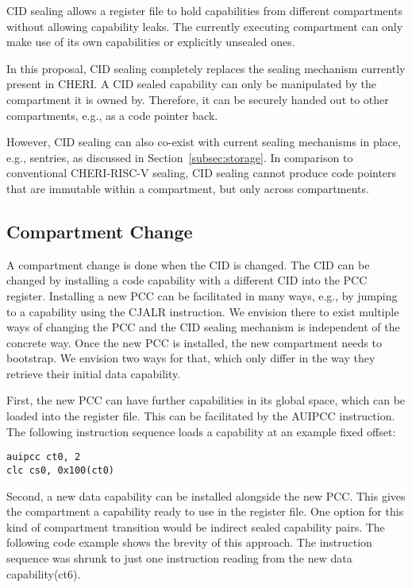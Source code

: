 CID sealing allows a register file to hold capabilities from different compartments without allowing capability leaks.
The currently executing compartment can only make use of its own capabilities or explicitly unsealed ones.

In this proposal, CID sealing completely replaces the sealing mechanism currently present in CHERI.
A CID sealed capability can only be manipulated by the compartment it is owned by.
Therefore, it can be securely handed out to other compartments, e.g., as a code pointer back.

However, CID sealing can also co-exist with current sealing mechanisms in place, e.g., sentries, as discussed in Section~\ref{subsec:storage}.
In comparison to conventional CHERI-RISC-V sealing, CID sealing cannot produce code pointers that are immutable within a compartment, but only across compartments.

\subsection{Compartment Change}
\label{subsec:comp_change}

A compartment change is done when the CID is changed.
The CID can be changed by installing a code capability with a different CID into the PCC register.
Installing a new PCC can be facilitated in many ways, e.g., by jumping to a capability using the CJALR instruction.
We envision there to exist multiple ways of changing the PCC and the CID sealing mechanism is independent of the concrete way.
Once the new PCC is installed, the new compartment needs to bootstrap.
We envision two ways for that, which only differ in the way they retrieve their initial data capability.

First, the new PCC can have further capabilities in its global space, which can be loaded into the register file.
This can be facilitated by the AUIPCC instruction.
The following instruction sequence loads a capability at an example fixed offset:

\texttt{auipcc ct0, 2}\\
\texttt{clc cs0, 0x100(ct0)}

Second, a new data capability can be installed alongside the new PCC.
This gives the compartment a capability ready to use in the register file.
One option for this kind of compartment transition would be indirect sealed capability pairs.
The following code example shows the brevity of this approach.
The instruction sequence was shrunk to just one instruction reading from the new data capability(ct6).

